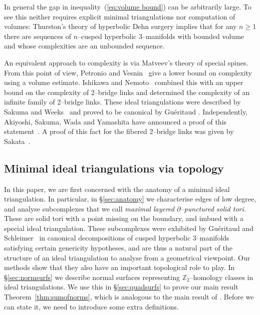 \documentclass[a4paper]{gtart}
\def\Z{\mathbb{Z}}
\theoremstyle{plain}
\theoremstyle{definition}
\theoremstyle{remark}
\numberwithin{equation}{section}
\begin{document}
In general the gap in inequality~(\ref{eq:volume bound}) can be arbitrarily large. To see this neither requires explicit minimal triangulations nor computation of volumes: Thurston's theory of hyperbolic Dehn surgery implies that for any $n\ge 1$ there are sequences of $n$--cusped hyperbolic 3--manifolds with bounded volume and whose complexities are an unbounded sequence.

An equivalent approach to complexity is via Matveev's theory of special spines. From this point of view,
Petronio and Vesnin~\cite{Petronio-two-sided-2009} give a lower bound on complexity using a volume estimate.
Ishikawa and Nemoto~\cite{Ishikawa-construction-2016} combined this with an upper bound on the complexity of 2--bridge links and determined the complexity of an infinite family of 2--bridge links. These ideal triangulations were described by Sakuma and Weeks~\cite{Sakuma-examples-1995} and proved to be canonical by Gu\'eritaud \cite[Theorem 2.1.7 in Section 2.1.4]{GueritaudPhDThesis}.
Independently, Akiyoshi, Sakuma, Wada and Yamashita have announced a proof of this statement~\cite{Akiyoshi-punctured-2007}. A proof of this fact for the fibered 2--bridge links was given by Sakata~\cite{Sakata-canonical-2015}.


\subsection{Minimal ideal triangulations via topology}

 In this paper, we are first concerned with the anatomy of a minimal ideal triangulation.
In particular, in \S\ref{sec:anatomy} we characterise edges of low degree, and analyse subcomplexes that we call \emph{maximal layered $\partial$--punctured solid tori.} These are solid tori with a point missing on the boundary, and imbued with a special ideal triangulation.
These subcomplexes were exhibited by 
Gu\'eritaud and Schleimer~\cite{Gueritaud-canonical-2010} in canonical decompositions of cusped hyperbolic 3--manifolds satisfying certain genericity hypotheses, and are thus a natural part of the structure of an ideal triangulation to analyse from a geometrical viewpoint. Our methods show that they also have an important topological role to play.
In \S\ref{sec:normsurfs} we describe normal surfaces representing $\Z_2$--homology classes in ideal triangulations. We use this in \S\ref{sec:quadsurfs} to prove our main result Theorem~\ref{thm:sumofnorms}, which is analogous to the main result of \cite{Jaco-Z2-2013}. Before we can state it, we need to introduce some extra definitions.
\end{document}
